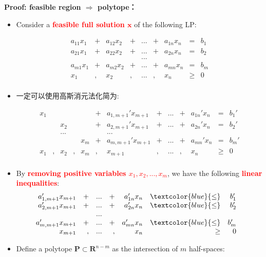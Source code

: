 \textbf{Proof: feasible region $\Rightarrow$ polytope：}
\begin{itemize}
\item
Consider a \textcolor{red}{\bf feasible full solution  $\mathbf{x}$ } of the following LP:
\begin{small}
\[
\begin{array}{rrrrrrrrrrrrl}
   & a_{11}x_1 &+& a_{12}x_2 &+& ... &+& a_{1n}x_n & = & b_1 &  \\
   & a_{21}x_1 &+& a_{22}x_2 &+& ... &+& a_{2n}x_n & = & b_2 &  \\
   &           & &           & & ... & &           &      &     &  \\
   & a_{m1}x_1 &+& a_{m2}x_2 &+& ... &+& a_{mn}x_n & = & b_m &  \\
   & x_1 &,& x_2 &,& ... &,& x_n & \geq & 0 &  \\
\end{array} \nonumber
\]
\end{small}
\item
一定可以使用高斯消元法化简为:
\begin{small}
\[
\begin{array}{rrrrrrrrrrrrrrrrrl}
   & x_1 & &     & &     &+& a_{1,m+1}'x_{m+1} &+& ... &+& a_{1n}'x_n & = & b_1' &  \\
   &     & & x_2 & &     &+& a_{2,m+1}'x_{m+1} &+&... &+& a_{2n}'x_n & = & b_2' &  \\
   &     & &  ...& &     & & ... & &           &      &     &  \\
   &     & &     & & x_m &+& a_{m,m+1}'x_{m+1}&+&... &+& a_{mn}'x_n & = & b_m' &  \\
   & x_1 &,& x_2 &,& x_m &,& x_{m+1}&,&... &,& x_n & \geq & 0 &  \\
\end{array} \nonumber
\]
\end{small}


\item
By \textcolor{red}{\bf removing  positive variables $x_1, x_2,..., x_m$}, we have the following \textcolor{red}{\bf linear inequalities}:
\[
\begin{array}{rrrrrrrrrrrrrrrrrl}
    a_{1,m+1}'x_{m+1} &+& ... &+& a_{1n}'x_n & \textcolor{blue}{\bf \leq} & b_1' &  \\
   a_{2,m+1}'x_{m+1} &+&... &+& a_{2n}'x_n & \textcolor{blue}{\bf \leq} & b_2' &  \\
    & &   ...        &      &     &  \\
    a_{m,m+1}'x_{m+1}&+&... &+& a_{mn}'x_n & \textcolor{blue}{\bf \leq} & b_m' &  \\
    x_{m+1}&,&... &,& x_n & \geq & 0 &  \\
\end{array} \nonumber
\]
\item Define  a polytope $\mathbf{P} \subset \mathbf{R}^{n-m}$  as the intersection of $m$ half-spaces:


\end{itemize}

